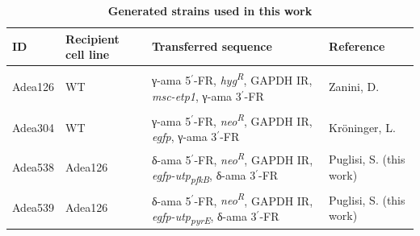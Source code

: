 \begin{table}[H]
        \caption{\textbf{Generated  strains used in this work}}
        \label{tab:Adea_list}
            \begin{tabular}{|Y{1.5cm}|Y{1.9cm}|Y{5.8cm}|Y{4cm}|}
            \hline
                \textbf{ID} & \textbf{Recipient cell line} & \textbf{Transferred sequence} & \textbf{Reference} \\  
            \hline
                Adea126 
                & \gls{WT}
                & \textgreek{γ}-ama 5$^\prime$-FR, \emph{hyg\textsuperscript{R}}, GAPDH IR, \emph{msc-etp1}, \textgreek{γ}-ama 3$^\prime$-FR
                & Zanini, D. \par \parencite{morales_host-symbiont_2023} \\
                Adea304 
                & \gls{WT} 
                & \textgreek{γ}-ama 5$^\prime$-FR, \emph{neo\textsuperscript{R}}, GAPDH IR, \emph{egfp}, \textgreek{γ}-ama 3$^\prime$-FR
                & Kröninger, L.  \\
                Adea538 
                & Adea126 
                & \textgreek{δ}-ama 5$^\prime$-FR, \emph{neo\textsuperscript{R}}, GAPDH IR, \emph{egfp-utp\textsubscript{pfkB}}, \textgreek{δ}-ama 3$^\prime$-FR
                & Puglisi, S. (this work)  \\
                Adea539 
                & Adea126 
                & \textgreek{δ}-ama 5$^\prime$-FR, \emph{neo\textsuperscript{R}}, GAPDH IR, \emph{egfp-utp\textsubscript{pyrE}}, \textgreek{δ}-ama 3$^\prime$-FR
                & Puglisi, S.  (this work)  \\
            \hline
        \end{tabular}
\end{table}

